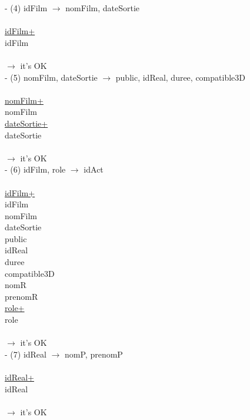 \documentclass[a4paper,sffamily,12pt]{article}
\begin{document}
						\noindent - (4) idFilm $\rightarrow$ nomFilm, dateSortie \\
							\\
							\underline{idFilm+} \\
							idFilm\\	
							\\									
						$\rightarrow$ it's OK \\	
						
						\noindent - (5) nomFilm, dateSortie $\rightarrow$ public, idReal, duree, compatible3D \\
							\\
							\underline{nomFilm+} \\
							nomFilm \\
							\underline{dateSortie+} \\
							dateSortie \\	
							\\									
						$\rightarrow$ it's OK \\	
						
						\noindent - (6) idFilm, role $\rightarrow$  idAct  \\
							\\
							\underline{idFilm+} \\
							idFilm \\
							nomFilm \\
							dateSortie \\
							public \\
							idReal \\
							duree \\
							compatible3D \\
							nomR \\
							prenomR \\
							\underline{role+} \\
							role \\	
							\\									
						$\rightarrow$ it's OK \\																				
			
						\noindent - (7) idReal $\rightarrow$ nomP, prenomP \\
							\\
							\underline{idReal+} \\
							idReal \\
							\\									
						$\rightarrow$ it's OK \\	
						
\end{document}
